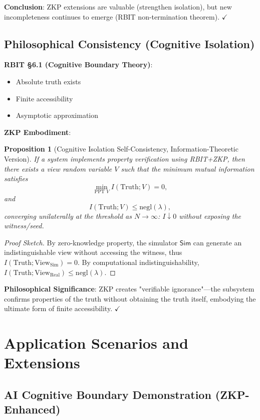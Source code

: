 \documentclass[12pt]{article}
\theoremstyle{plain}
\newtheorem{proposition}[theorem]{Proposition}
\theoremstyle{definition}
\begin{document}
\textbf{Conclusion}: ZKP extensions are valuable (strengthen isolation), but new incompleteness continues to emerge (RBIT non-termination theorem). $\checkmark$

\subsection{Philosophical Consistency (Cognitive Isolation)}

\textbf{RBIT \S 6.1 (Cognitive Boundary Theory)}:
\begin{itemize}
\item Absolute truth exists
\item Finite accessibility
\item Asymptotic approximation
\end{itemize}

\textbf{ZKP Embodiment}:

\begin{proposition}[Cognitive Isolation Self-Consistency, Information-Theoretic Version]
If a system implements property verification using RBIT+ZKP, then there exists a view random variable $V$ such that the minimum mutual information satisfies
\[
\min_{\text{PPT } V} I(\text{Truth}; V) = 0,
\]
and
\[
I(\text{Truth}; V) \le \text{negl}(\lambda),
\]
converging unilaterally at the threshold as $N \to \infty$: $I \downarrow 0$ without exposing the witness/seed.
\end{proposition}

\begin{proof}[Proof Sketch]
By zero-knowledge property, the simulator $\mathsf{Sim}$ can generate an indistinguishable view without accessing the witness, thus $I(\text{Truth}; \text{View}_{\text{Sim}}) = 0$. By computational indistinguishability, $I(\text{Truth}; \text{View}_{\text{Real}}) \le \text{negl}(\lambda)$.
\end{proof}

\textbf{Philosophical Significance}: ZKP creates "verifiable ignorance"—the subsystem confirms properties of the truth without obtaining the truth itself, embodying the ultimate form of finite accessibility. $\checkmark$

\section{Application Scenarios and Extensions}

\subsection{AI Cognitive Boundary Demonstration (ZKP-Enhanced)}
\end{document}
